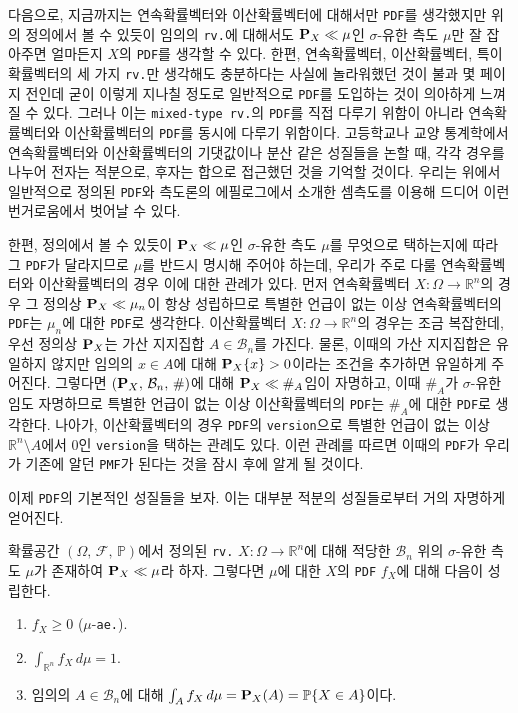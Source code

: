 다음으로, 지금까지는 연속확률벡터와 이산확률벡터에 대해서만 \texttt{PDF}를 생각했지만 위의 정의에서 볼 수 있듯이 임의의 \texttt{rv.}에 대해서도 $\mathbf{P}_X\ll\mu$인 $\sigma$-유한 측도 $\mu$만 잘 잡아주면 얼마든지 $X$의 \texttt{PDF}를 생각할 수 있다. 한편, 연속확률벡터, 이산확률벡터, 특이확률벡터의 세 가지 \texttt{rv.}만 생각해도 충분하다는 사실에 놀라워했던 것이 불과 몇 페이지 전인데 굳이 이렇게 지나칠 정도로 일반적으로 \texttt{PDF}를 도입하는 것이 의아하게 느껴질 수 있다. 그러나 이는 \texttt{mixed-type rv.}의 \texttt{PDF}를 직접 다루기 위함이 아니라 연속확률벡터와 이산확률벡터의 \texttt{PDF}를 동시에 다루기 위함이다. 고등학교나 교양 통계학에서 연속확률벡터와 이산확률벡터의 기댓값이나 분산 같은 성질들을 논할 때, 각각 경우를 나누어 전자는 적분으로, 후자는 합으로 접근했던 것을 기억할 것이다. 우리는 위에서 일반적으로 정의된 \texttt{PDF}와 측도론의 에필로그에서 소개한 셈측도를 이용해 드디어 이런 번거로움에서 벗어날 수 있다.

한편, 정의에서 볼 수 있듯이 $\mathbf{P}_X\ll\mu$인 $\sigma$-유한 측도 $\mu$를 무엇으로 택하는지에 따라 그 \texttt{PDF}가 달라지므로 $\mu$를 반드시 명시해 주어야 하는데, 우리가 주로 다룰 연속확률벡터와 이산확률벡터의 경우 이에 대한 관례가 있다. 먼저 연속확률벡터 $X:\Omega\to\mathbb{R}^n$의 경우 그 정의상 $\mathbf{P}_X\ll\mu_n$이 항상 성립하므로 특별한 언급이 없는 이상 연속확률벡터의 \texttt{PDF}는 $\mu_n$에 대한 \texttt{PDF}로 생각한다. 이산확률벡터 $X:\Omega\to\mathbb{R}^n$의 경우는 조금 복잡한데, 우선 정의상 $\mathbf{P}_X$는 가산 지지집합 $A\in\mathcal{B}_n$를 가진다. 물론, 이때의 가산 지지집합은 유일하지 않지만 임의의 $x\in A$에 대해 $\mathbf{P}_X\{x\}>0$이라는 조건을 추가하면 유일하게 주어진다. 그렇다면 $(\mathbf{P}_X,\,\mathcal{B}_n,\,\#)$에 대해 $\mathbf{P}_X\ll\#_A$임이 자명하고, 이때 $\#_A$가 $\sigma$-유한임도 자명하므로 특별한 언급이 없는 이상 이산확률벡터의 \texttt{PDF}는 $\#_A$에 대한 \texttt{PDF}로 생각한다. 나아가, 이산확률벡터의 경우 \texttt{PDF}의 \texttt{version}으로 특별한 언급이 없는 이상 $\mathbb{R}^n\setminus A$에서 $0$인 \texttt{version}을 택하는 관례도 있다. 이런 관례를 따르면 이때의 \texttt{PDF}가 우리가 기존에 알던 \texttt{PMF}가 된다는 것을 잠시 후에 알게 될 것이다.

이제 \texttt{PDF}의 기본적인 성질들을 보자. 이는 대부분 적분의 성질들로부터 거의 자명하게 얻어진다.

\begin{theorem}\label{thm:PDFProp}
    확률공간 $(\Omega,\,\mathcal{F},\,\mathbb{P})$에서 정의된 \texttt{rv.} $X:\Omega\to\mathbb{R}^n$에 대해 적당한 $\mathcal{B}_n$ 위의 $\sigma$-유한 측도 $\mu$가 존재하여 $\mathbf{P}_X\ll\mu$라 하자. 그렇다면 $\mu$에 대한 $X$의 \texttt{PDF} $f_X$에 대해 다음이 성립한다.
    \begin{enumerate}
        \item $f_X\geq0$ ($\mu$-\texttt{ae.}).
        \item $\int_{\mathbb{R}^n}f_X\,d\mu=1$.
        \item 임의의 $A\in\mathcal{B}_n$에 대해 $\int_Af_X\,d\mu=\mathbf{P}_X(A)=\mathbb{P}\{X\in A\}$이다.
    \end{enumerate}
\end{theorem}

